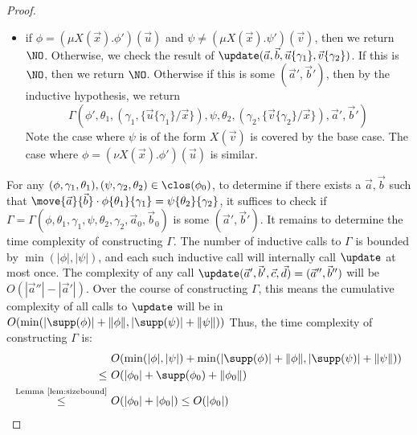 \begin{proof}
\begin{itemize}
				\item if $\phi = (\mu X(\vec x).\phi')(\vec u)$ and $\psi \neq (\mu X(\vec x).\psi')(\vec v)$, then we return $\NO$.
		Otherwise, we check the result of $\update(\vec a, \vec b, \vec u\{\gamma_1\}, \vec v\{\gamma_2\})$. If this is $\NO$, then we return $\NO$. 
		Otherwise if this is some $(\vec a', \vec b')$, then 
		by the inductive hypothesis, we return $$\Gamma(\phi', \theta_1, (\gamma_1, \{\vec u\{\gamma_1\} / \vec x\}), \psi, \theta_2, (\gamma_2, \{\vec v\{\gamma_2\} / \vec x\}), \vec a', \vec b')$$
		Note the case where $\psi$ is of the form $X(\vec v)$ is covered by the base case.
		The case where $\phi = (\nu X(\vec x).\phi')(\vec u)$ is similar.
	\end{itemize}
	For any $(\phi, \gamma_1, \theta_1), (\psi, \gamma_2, \theta_2) \in \clos(\phi_0)$, to determine if there exists a $\vec a, \vec b$ such that $\move{\vec a}{\vec b}\cdot \phi\{\theta_1\}\{\gamma_1\} = \psi\{\theta_2\}\{\gamma_2\}$, it suffices to check if $\Gamma = \Gamma(\phi, \theta_1, \gamma_1, \psi, \theta_2, \gamma_2, \vec a_0, \vec b_0)$ is some $(\vec a', \vec b')$.
	It remains to determine the time complexity of constructing $\Gamma$.  
	The number of inductive calls to $\Gamma$ is bounded by $\min(|\phi|, |\psi|)$, and each such inductive call will internally call $\update$ at most once.
	The complexity of any call $\update(\vec a', \vec b', \vec c, \vec d) = (\vec a'', \vec b'')$ will be $O(|\vec a''| - |\vec a'|)$.  
	Over the course of constructing $\Gamma$, this means the cumulative complexity of all calls to $\update$ will be in $O(\min(|\supp(\phi)| + \|\phi\|, |\supp(\psi)| + \|\psi\|))$
	Thus, the time complexity of constructing $\Gamma$ is:
	\begin{align*}
		&O(\min(|\phi|, |\psi|) + \min(|\supp(\phi)| + \|\phi\|, |\supp(\psi)| + \|\psi\|)) \\
		\le\ &O(|\phi_0| + \supp(\phi_0) + \|\phi_0\|) \\
		\overset{\text{Lemma~\ref{lem:sizebound}}}{\le}\ &O(|\phi_0| + |\phi_0|) \le O(|\phi_0|)
	\end{align*} 
\end{proof}

